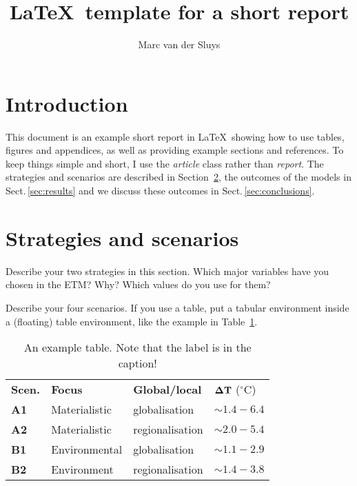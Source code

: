 \documentclass[11pt]{article}  %
\title{\LaTeX\ template for a short report}
\author{Marc van der Sluys}
\begin{document}
\maketitle

\tableofcontents


\section{Introduction}
\label{sec:intro}

This document is an example short report in \LaTeX\ showing how to use tables, figures and appendices, as well
as providing example sections and references.  To keep things simple and short, I use the \emph{article} class
rather than \emph{report}.  The strategies and scenarios are described in Section~\ref{sec:scenarios}, the
outcomes of the models in Sect.\,\ref{sec:results} and we discuss these outcomes in
Sect.\,\ref{sec:conclusions}.


\section{Strategies and scenarios}
\label{sec:scenarios}

Describe your two strategies in this section.  Which major variables have you chosen in the
ETM?  Why?  Which values do you use for them?

Describe your four scenarios.  If you use a table, put a tabular environment inside a (floating) table
environment, like the example in Table~\ref{tab:example}.

\begin{table}
  \centering
  \begin{tabular}{llll}
    \textbf{Scen.} & \textbf{Focus} & \textbf{Global/local} & $\bf \Delta T$ ($^\circ$C) \\
    \textbf{A1}    &  Materialistic & globalisation         & $\sim 1.4 - 6.4$ \\
    \textbf{A2}    &  Materialistic & regionalisation       & $\sim 2.0 - 5.4$ \\
    \textbf{B1}    &  Environmental & globalisation         & $\sim 1.1 - 2.9$ \\
    \textbf{B2}    &  Environment   & regionalisation       & $\sim 1.4 - 3.8$ \\
  \end{tabular}
  \caption{An example table.  Note that the label is in the caption!
    \label{tab:example}
  }
\end{table}
\end{document}
